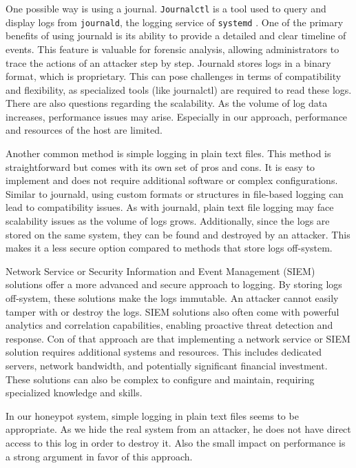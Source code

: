 One possible way is using a journal. \texttt{Journalctl} is a tool used to query and display logs from \texttt{journald}, the logging service of \texttt{systemd} \cite{noauthor_journalctl_2023}.
One of the primary benefits of using journald is its ability to provide a detailed and clear timeline of events. This feature is valuable for forensic analysis, allowing administrators to trace the actions of an attacker step by step. Journald stores logs in a binary format, which is proprietary. This can pose challenges in terms of compatibility and flexibility, as specialized tools (like journalctl) are required to read these logs. There are also questions regarding the scalability. As the volume of log data increases, performance issues may arise. Especially in our approach, performance and resources of the host are limited.

Another common method is simple logging in plain text files. This method is straightforward but comes with its own set of pros and cons. It is easy to implement and does not require additional software or complex configurations. Similar to journald, using custom formats or structures in file-based logging can lead to compatibility issues. As with journald, plain text file logging may face scalability issues as the volume of logs grows. Additionally, since the logs are stored on the same system, they can be found and destroyed by an attacker. This makes it a less secure option compared to methods that store logs off-system.

Network Service or Security Information and Event Management (SIEM) solutions offer a more advanced and secure approach to logging. By storing logs off-system, these solutions make the logs immutable. An attacker cannot easily tamper with or destroy the logs. SIEM solutions also often come with powerful analytics and correlation capabilities, enabling proactive threat detection and response. Con of that approach are that implementing a network service or SIEM solution requires additional systems and resources. This includes dedicated servers, network bandwidth, and potentially significant financial investment. These solutions can also be complex to configure and maintain, requiring specialized knowledge and skills.

In our honeypot system, simple logging in plain text files seems to be appropriate. As we hide the real system from an attacker, he does not have direct access to this log in order to destroy it. Also the small impact on performance is a strong argument in favor of this approach.